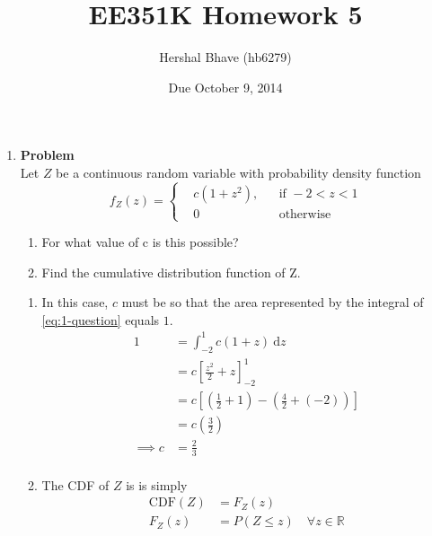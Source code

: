 \documentclass[12pt]{article}
\title{EE351K Homework 5}
\author{Hershal Bhave (hb6279)}
\date{Due October 9, 2014}
\newenvironment{Ex}{\textbf{Problem}\vspace{.75em}\\}{}
\newcommand{\dd}[1]{\:\mathrm{d}{#1}}
\begin{document}
\maketitle
\begin{enumerate}
\item
  \begin{Ex}
    Let $Z$ be a continuous random variable with probability density
    function
    \begin{equation}
      \label{eq:1-question}
      f_Z(z) = \left\{
        \begin{aligned}
          & c(1+z^2), && \text{if }-2<z<1 \\
          & 0 && \text{otherwise}
        \end{aligned} \right.
    \end{equation}
    \begin{enumerate}
    \item For what value of c is this possible?
    \item Find the cumulative distribution function of Z.
    \end{enumerate}
    \begin{solution} \hfill
      \begin{enumerate}
      \item In this case, $c$ must be so that the area represented by
        the integral of \cref{eq:1-question} equals $1$.
        \begin{equation}
          \label{eq:1a-sol}
          \begin{aligned}
            1 &= \int_{-2}^{1} c(1+z) \dd{z} \\
            &= c\left[\frac{z^2}{2} + z\right]_{-2}^{1} \\
            &= c\left[\left(\frac{1}{2}+1\right) - \left(\frac{4}{2}+(-2)\right)\right] \\
            &= c\left(\frac{3}{2}\right) \\
            \implies c &= \frac{2}{3} \\
          \end{aligned}
        \end{equation}
      \item The CDF of $Z$ is is simply
        \begin{equation}
          \label{eq:1b-sol}
          \begin{aligned}
            \text{CDF}(Z) &= F_Z(z) \\
            F_Z(z) &= P(Z\le z) \quad \forall z \in \mathbb{R} \\

\end{aligned}
\end{equation}
\end{enumerate}
\end{solution}
\end{Ex}
\end{enumerate}
\end{document}

